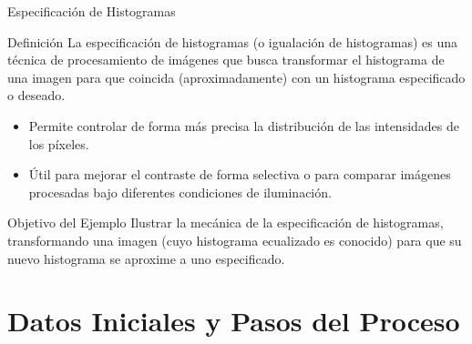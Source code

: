 \documentclass{beamer}
\begin{document}
\begin{frame}{Especificación de Histogramas}
  \begin{block}{Definición}
    La especificación de histogramas (o igualación de histogramas) es una técnica de procesamiento de imágenes que busca transformar el histograma de una imagen para que coincida (aproximadamente) con un histograma especificado o deseado.
  \end{block}

  \begin{itemize}
    \item Permite controlar de forma más precisa la distribución de las intensidades de los píxeles.
    \item Útil para mejorar el contraste de forma selectiva o para comparar imágenes procesadas bajo diferentes condiciones de iluminación.
  \end{itemize}

  \begin{alertblock}{Objetivo del Ejemplo}
    Ilustrar la mecánica de la especificación de histogramas, transformando una imagen (cuyo histograma ecualizado es conocido) para que su nuevo histograma se aproxime a uno especificado.
  \end{alertblock}
\end{frame}

\section{Datos Iniciales y Pasos del Proceso}
\end{document}
